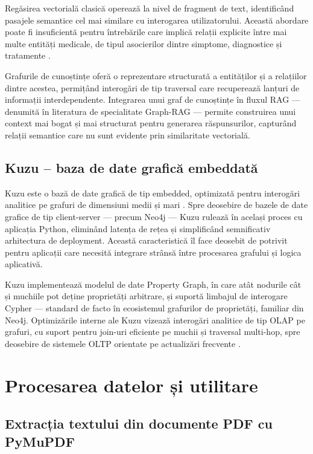 \documentclass[12pt, a4paper, oneside, romanian]{teza-upb}
\begin{document}
Regăsirea vectorială clasică operează la nivel de fragment de text, identificând pasajele semantice cel mai similare cu interogarea utilizatorului. Această abordare poate fi insuficientă pentru întrebările care implică relații explicite între mai multe entități medicale, de tipul asocierilor dintre simptome, diagnostice și tratamente \cite{lewis2020retrieval}.

Grafurile de cunoștințe oferă o reprezentare structurată a entităților și a relațiilor dintre acestea, permițând interogări de tip traversal care recuperează lanțuri de informații interdependente. Integrarea unui graf de cunoștințe în fluxul RAG — denumită în literatura de specialitate Graph-RAG \cite{edge2024local} — permite construirea unui context mai bogat și mai structurat pentru generarea răspunsurilor, capturând relații semantice care nu sunt evidente prin similaritate vectorială.

\subsection{Kuzu -- baza de date grafică embeddată}

Kuzu este o bază de date grafică de tip embedded, optimizată pentru interogări analitice pe grafuri de dimensiuni medii și mari \cite{kuzu_doc}. Spre deosebire de bazele de date grafice de tip client-server — precum Neo4j — Kuzu rulează în același proces cu aplicația Python, eliminând latența de rețea și simplificând semnificativ arhitectura de deployment. Această caracteristică îl face deosebit de potrivit pentru aplicații care necesită integrare strânsă între procesarea grafului și logica aplicativă.

Kuzu implementează modelul de date Property Graph, în care atât nodurile cât și muchiile pot deține proprietăți arbitrare, și suportă limbajul de interogare Cypher — standard de facto în ecosistemul grafurilor de proprietăți, familiar din Neo4j. Optimizările interne ale Kuzu vizează interogări analitice de tip OLAP pe grafuri, cu suport pentru join-uri eficiente pe muchii și traversal multi-hop, spre deosebire de sistemele OLTP orientate pe actualizări frecvente \cite{kuzu_doc}.

\section{Procesarea datelor și utilitare}

\subsection{Extracția textului din documente PDF cu PyMuPDF}
\end{document}
